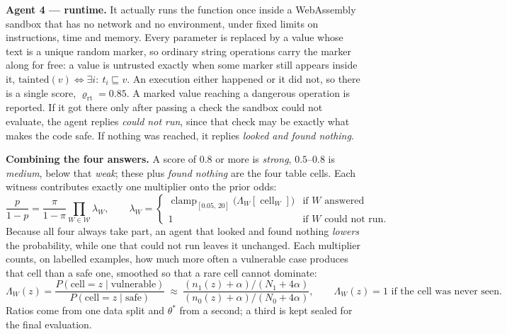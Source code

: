 \documentclass[9pt,journal,onecolumn]{IEEEtran}
\newcommand{\Wit}{\mathcal{W}}
\newcommand{\LR}{\Lambda}
\newcommand{\clampop}{\operatorname{clamp}}
\newcommand{\cellop}{\operatorname{cell}}
\begin{document}
\noindent\textbf{Agent 4 --- runtime.} It actually runs the function once inside a WebAssembly
sandbox that has no network and no environment, under fixed limits on instructions, time and memory.
Every parameter is replaced by a value whose text is a unique random marker, so ordinary string
operations carry the marker along for free: a value is untrusted exactly when some marker still
appears inside it, $\mathrm{tainted}(v)\iff \exists i:\ t_i \sqsubseteq v$. An execution either
happened or it did not, so there is a single score, $\varrho_{\mathrm{rt}}=0.85$.
A marked value reaching a dangerous operation is reported. If it got there only after passing a check
the sandbox could not evaluate, the agent replies \emph{could not run}, since that check may be
exactly what makes the code safe. If nothing was reached, it replies \emph{looked and found nothing}.

\noindent\textbf{Combining the four answers.} A score of $0.8$ or more is \emph{strong}, $0.5$--$0.8$
is \emph{medium}, below that \emph{weak}; these plus \emph{found nothing} are the four table cells.
Each witness contributes exactly one multiplier onto the prior odds:
\begin{equation}
\frac{p}{1-p}=\frac{\pi}{1-\pi}\prod_{W\in\Wit}\lambda_W,
\qquad
\lambda_W=\begin{cases}\clampop_{[0.05,\,20]}\bigl(\LR_W[\cellop_W]\bigr) & \text{if } W \text{ answered}\\[2pt] 1 & \text{if } W \text{ could not run.}\end{cases}
\end{equation}
Because all four always take part, an agent that looked and found nothing \emph{lowers} the
probability, while one that could not run leaves it unchanged. Each multiplier counts, on labelled
examples, how much more often a vulnerable case produces that cell than a safe one, smoothed so that
a rare cell cannot dominate:
\begin{equation}
\LR_W(z)=\frac{P(\text{cell}=z \mid \text{vulnerable})}{P(\text{cell}=z \mid \text{safe})}
\ \approx\ \frac{(n_1(z)+\alpha)/(N_1+4\alpha)}{(n_0(z)+\alpha)/(N_0+4\alpha)},
\qquad \LR_W(z)=1 \text{ if the cell was never seen.}
\end{equation}
Ratios come from one data split and $\theta^{*}$ from a second; a third is kept sealed for the final
evaluation.
\end{document}
